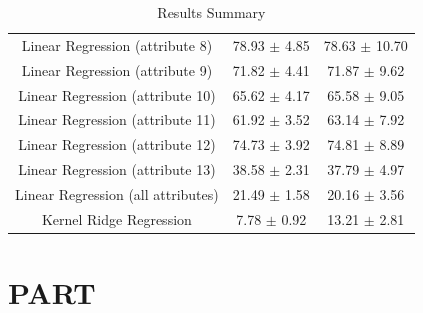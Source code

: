 \documentclass[A4,12pt]{article}
\begin{document}
\begin{enumerate}[5.]
\begin{enumerate}[a.]
\begin{center}
\begin{table}
\begin{tabular}{ccc}
            Linear Regression (attribute 8)  & 78.93 $\pm$ 4.85 & 78.63 $\pm$ 10.70 \\
            Linear Regression (attribute 9)  & 71.82 $\pm$ 4.41 & 71.87 $\pm$ 9.62 \\
            Linear Regression (attribute 10)  & 65.62 $\pm$ 4.17 & 65.58 $\pm$ 9.05 \\
            Linear Regression (attribute 11)  & 61.92 $\pm$ 3.52 & 63.14 $\pm$ 7.92 \\
            Linear Regression (attribute 12)  & 74.73 $\pm$ 3.92 & 74.81 $\pm$ 8.89 \\
            Linear Regression (attribute 13)  & 38.58 $\pm$ 2.31 & 37.79 $\pm$ 4.97 \\
            Linear Regression (all attributes)  & 21.49 $\pm$ 1.58 & 20.16 $\pm$ 3.56 \\
            Kernel Ridge Regression  & 7.78 $\pm$ 0.92 & 13.21 $\pm$ 2.81 \\
          \hline
        \end{tabular}
        \caption{Results Summary\label{table:5d}}
        \centering
      \end{table}
    \end{center}

  \end{enumerate}
\end{enumerate}

\section{PART \uppercase\expandafter{}}
\end{document}
